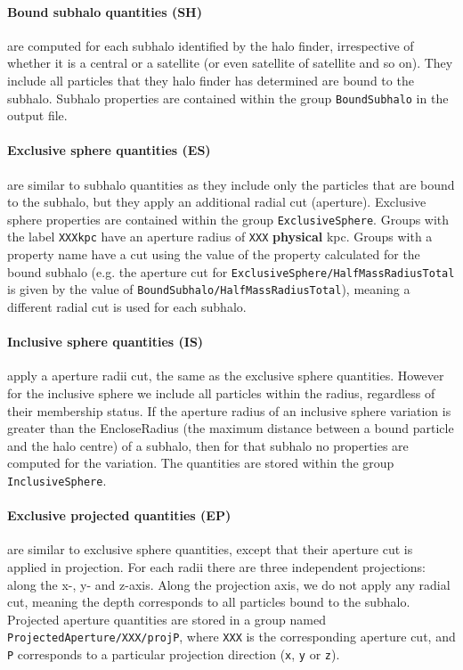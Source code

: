 \documentclass{article}
\begin{document}
\paragraph{Bound subhalo quantities (SH)} are computed for each subhalo identified by the halo finder, irrespective of whether 
it is a central or a satellite (or even satellite of satellite and so on). They include all particles
that they halo finder has determined are bound to the subhalo. Subhalo properties are contained within the group 
\verb+BoundSubhalo+ in the output file.

\paragraph{Exclusive sphere quantities (ES)} are similar to subhalo quantities as they include only the 
particles that are bound to the subhalo, but they apply an additional radial cut (aperture). Exclusive sphere 
properties are contained within the group \verb+ExclusiveSphere+. Groups with the label \verb+XXXkpc+ have an
aperture radius of \verb+XXX+ \textbf{physical} kpc. Groups with a property name have a cut using the value 
of the property calculated for the bound subhalo (e.g. the aperture cut for \verb+ExclusiveSphere/HalfMassRadiusTotal+
is given by the value of \verb+BoundSubhalo/HalfMassRadiusTotal+), meaning a different radial cut is used for each subhalo.

\paragraph{Inclusive sphere quantities (IS)} apply a aperture radii cut, the same as the exclusive sphere 
quantities. However for the inclusive sphere we include all particles within the radius, regardless of their 
membership status. If the aperture radius of an inclusive sphere variation is greater than the EncloseRadius
(the maximum distance between a bound particle and the halo centre) of a subhalo, then for that subhalo no
properties are computed for the variation.
The quantities are stored within the group \verb+InclusiveSphere+.

\paragraph{Exclusive projected quantities (EP)} are similar to exclusive sphere quantities, except that their
aperture cut is applied in projection. For each radii there are three  independent projections: along the 
x-, y- and z-axis. Along the projection axis, we do not apply any radial cut, meaning the depth corresponds to all particles 
bound to the subhalo. Projected aperture quantities are stored in a group named 
\verb+ProjectedAperture/XXX/projP+, where \verb+XXX+ is the corresponding aperture cut, and \verb+P+ 
corresponds to a particular projection direction (\verb+x+, \verb+y+ or \verb+z+).
\end{document}
